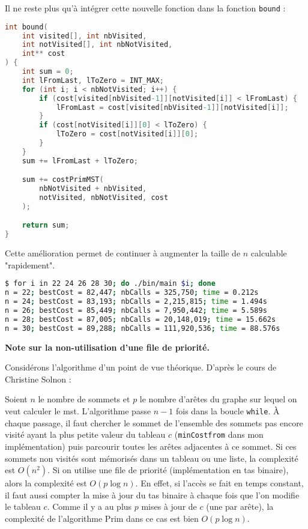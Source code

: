 Il ne reste plus qu'à intégrer cette nouvelle fonction dans la fonction \texttt{bound} :

\begin{lstlisting}[language=C, caption={Intégration de l'algorithme de Prim dans la fonction \texttt{bound}.}]
int bound(
    int visited[], int nbVisited, 
    int notVisited[], int nbNotVisited,
    int** cost
) {
    int sum = 0;
    int lFromLast, lToZero = INT_MAX;
    for (int i; i < nbNotVisited; i++) {
        if (cost[visited[nbVisited-1]][notVisited[i]] < lFromLast) {
            lFromLast = cost[visited[nbVisited-1]][notVisited[i]];
        }
        if (cost[notVisited[i]][0] < lToZero) {
            lToZero = cost[notVisited[i]][0];
        }
    }
    sum += lFromLast + lToZero;

    sum += costPrimMST(
        nbNotVisited + nbVisited, 
        notVisited, nbNotVisited, cost
    );

    return sum;
}
\end{lstlisting}

Cette amélioration permet de continuer à augmenter la taille de $n$ calculable "rapidement".

\begin{lstlisting}[language=bash, caption={Résultats d'exécution de l'algorithme \texttt{permut} pour différentes valeurs de $n$.}]
$ for i in 22 24 26 28 30; do ./bin/main $i; done
n = 22; bestCost = 82,447; nbCalls = 325,750; time = 0.212s
n = 24; bestCost = 83,193; nbCalls = 2,215,815; time = 1.494s
n = 26; bestCost = 85,449; nbCalls = 7,950,442; time = 5.589s
n = 28; bestCost = 87,005; nbCalls = 20,148,019; time = 15.662s
n = 30; bestCost = 89,288; nbCalls = 111,920,536; time = 88.576s
\end{lstlisting}

\textbf{Note sur la non-utilisation d'une file de priorité.}

Considérons l'algorithme d'un point de vue théorique. D'après le cours de Christine Solnon :

Soient $n$ le nombre de sommets et $p$ le nombre d'arêtes du graphe sur lequel on veut calculer le \acrshort{mst}. L'algorithme passe $n - 1$ fois dans la boucle \texttt{while}. À chaque passage, il faut chercher le sommet de l'ensemble des sommets pas encore visité ayant la plus petite valeur du tableau $c$ (\texttt{minCostfrom} dans mon implémentation) puis parcourir toutes les arêtes adjacentes à ce sommet. Si ces sommets non visités sont mémorisés dans un tableau ou une liste, la complexité est $O(n^2)$. Si on utilise une file de priorité (implémentation en tas binaire), alors la complexité est $O(p \log n)$. En effet, si l'accès se fait en temps constant, il faut aussi compter la mise à jour du tas binaire à chaque fois que l'on modifie le tableau $c$. Comme il y a au plus $p$ mises à jour de $c$ (une par arête), la complexité de l'algorithme Prim dans ce cas est bien $O(p \log n)$.

